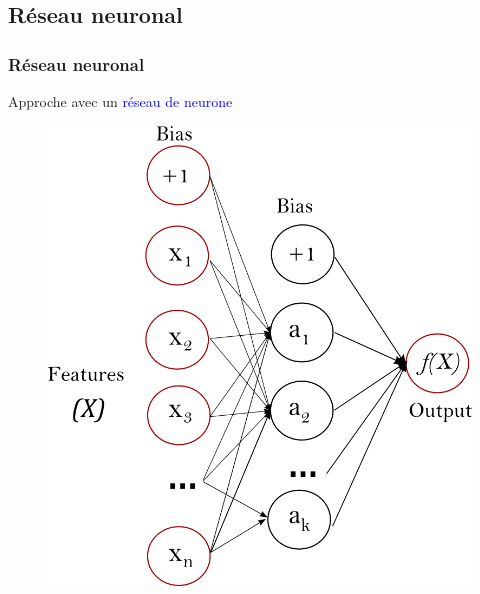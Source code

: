 \documentclass{beamer}[aspectratio = 43]
\begin{document}
\subsection*{Réseau neuronal}
\begin{frame}
	\frametitle{Réseau neuronal}
	Approche avec un \textcolor{blue}{réseau de neurone}
	\begin{figure}[t]
		\centering
		\begin{minipage}{0.5\textwidth}
			\includegraphics[scale=0.2]{nn_sk}
		\end{minipage}
	\end{figure}
\end{frame}
\end{document}
